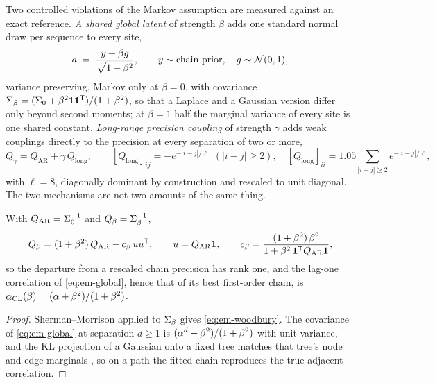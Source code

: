 Two controlled violations of the Markov assumption are measured against an
exact reference. \emph{A shared global latent} of strength $\beta$ adds one
standard normal draw per sequence to every site,
\begin{equation}
  a \;=\; \frac{y + \beta g}{\sqrt{1+\beta^2}},
  \qquad y \sim \text{chain prior},
  \quad g \sim \mathcal{N}(0,1),
  \label{eq:em-global}
\end{equation}
variance preserving, Markov only at $\beta = 0$, with covariance
$\Sigma_\beta = (\Sigma_0 + \beta^2\mathbf 1\mathbf 1^{\mathsf{T}})/(1+\beta^2)$, so that a
Laplace and a Gaussian version differ only beyond second moments; at
$\beta = 1$ half the marginal variance of every site is one shared constant.
\emph{Long-range precision coupling} of strength $\gamma$ adds weak couplings
directly to the precision at every separation of two or more,
\begin{equation}
  Q_\gamma = Q_{\mathrm{AR}} + \gamma\,Q_{\mathrm{long}},
  \qquad
  [Q_{\mathrm{long}}]_{ij} = -e^{-|i-j|/\ell}\ \ (|i-j| \ge 2),
  \quad
  [Q_{\mathrm{long}}]_{ii} = 1.05 \sum_{|i-j| \ge 2} e^{-|i-j|/\ell},
  \label{eq:em-longrange}
\end{equation}
with $\ell = 8$, diagonally dominant by construction and rescaled to unit
diagonal. The two mechanisms are not two amounts of the same thing.

\begin{proposition}
\label{prop:em-rankone}
With $Q_{\mathrm{AR}} = \Sigma_0^{-1}$ and $Q_\beta = \Sigma_\beta^{-1}$,
\begin{equation}
  Q_\beta = (1+\beta^2)\,Q_{\mathrm{AR}} - c_\beta\, u u^{\mathsf{T}},
  \qquad
  u = Q_{\mathrm{AR}}\mathbf{1},
  \qquad
  c_\beta = \frac{(1+\beta^2)\,\beta^2}{1 + \beta^2\,\mathbf{1}^{\mathsf{T}}Q_{\mathrm{AR}}\mathbf{1}},
  \label{eq:em-woodbury}
\end{equation}
so the departure from a rescaled chain precision has rank one, and the lag-one
correlation of \eqref{eq:em-global}, hence that of its best first-order chain,
is $\alpha_{\mathrm{CL}}(\beta) = (\alpha + \beta^2)/(1+\beta^2)$.
\end{proposition}

\begin{proof}
Sherman--Morrison applied to $\Sigma_\beta$ gives \eqref{eq:em-woodbury}. The
covariance of \eqref{eq:em-global} at separation $d \ge 1$ is
$(\alpha^d + \beta^2)/(1+\beta^2)$ with unit variance, and the KL projection of
a Gaussian onto a fixed tree matches that tree's node and edge marginals
\citep{chow1968approximating}, so on a path the fitted chain reproduces the
true adjacent correlation.
\end{proof}

